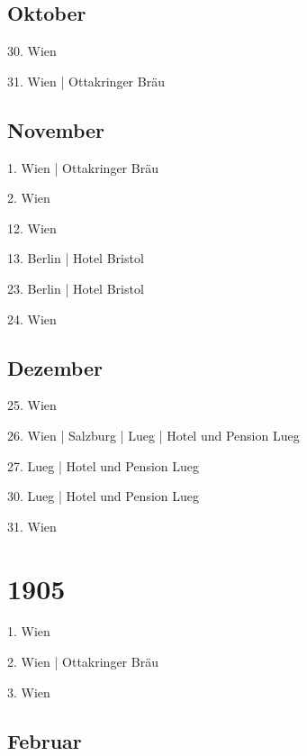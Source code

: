 \documentclass[twoside=false,titlepage=false,open=any, parskip=never, fontsize=10pt, headings=small, chapterprefix=false, appendixprefix=false, DIV=15]{scrbook}
\begin{document}
\begin{multicols}{3}
            \section*{Oktober}
            30. Wien\par
            31. Wien | Ottakringer Bräu\par
            \section*{November}
            1. Wien | Ottakringer Bräu\par
            2. Wien\par
            12. Wien\par
            13. Berlin | Hotel Bristol\par
            23. Berlin | Hotel Bristol\par
            24. Wien\par
            \section*{Dezember}
            25. Wien\par
            26. Wien | Salzburg | Lueg | Hotel und Pension Lueg\par
            27. Lueg | Hotel und Pension Lueg\par
            30. Lueg | Hotel und Pension Lueg\par
            31. Wien\par
            \chapter*{1905}
            1. Wien\par
            2. Wien | Ottakringer Bräu\par
            3. Wien\par
            \section*{Februar}

\end{multicols}
\end{document}
